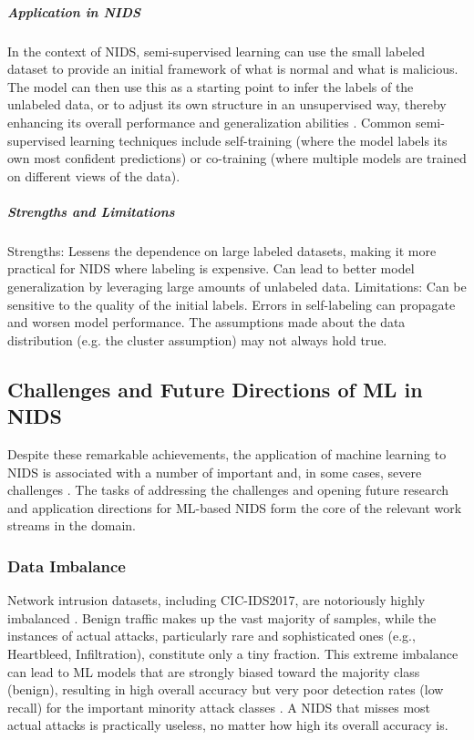 \subparagraph{Application in NIDS} 
In the context of NIDS, semi-supervised learning can use the small labeled dataset to provide an initial framework of what is normal and what is malicious. The model can then use this as a starting point to infer the labels of the unlabeled data, or to adjust its own structure in an unsupervised way, thereby enhancing its overall performance and generalization abilities \parencite {zou2021survey}. Common semi-supervised learning techniques include self-training (where the model labels its own most confident predictions) or co-training (where multiple models are trained on different views of the data).

\subparagraph{Strengths and Limitations} 
Strengths: Lessens the dependence on large labeled datasets, making it more practical for NIDS where labeling is expensive. Can lead to better model generalization by leveraging large amounts of unlabeled data.
Limitations: Can be sensitive to the quality of the initial labels. Errors in self-labeling can propagate and worsen model performance. The assumptions made about the data distribution (e.g. the cluster assumption) may not always hold true.

\subsection{Challenges and Future Directions of ML in NIDS}
Despite these remarkable achievements, the application of machine learning to NIDS is associated with a number of important and, in some cases, severe challenges \parencite{sharafaldin2018survey, al2020comprehensive}. The tasks of addressing the challenges and opening future research and application directions for ML-based NIDS form the core of the relevant work streams in the domain.

\subsubsection{Data Imbalance} 
Network intrusion datasets, including CIC-IDS2017, are notoriously highly imbalanced \parencite {sharafaldin2018toward}. Benign traffic makes up the vast majority of samples, while the instances of actual attacks, particularly rare and sophisticated ones (e.g., Heartbleed, Infiltration), constitute only a tiny fraction. This extreme imbalance can lead to ML models that are strongly biased toward the majority class (benign), resulting in high overall accuracy but very poor detection rates (low recall) for the important minority attack classes \parencite {agrawal2021survey}. A NIDS that misses most actual attacks is practically useless, no matter how high its overall accuracy is.

